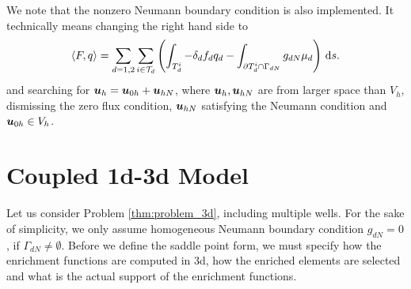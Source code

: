We note that the nonzero Neumann boundary condition is also implemented.
It technically means changing the right hand side to
\begin{equation} \label{eqn:saddle_point_2d_nonzero_neumann}
 \langle F, q\rangle = \sum_{d=1,2}\sum_{i\in \mathcal T_d}\left(
        \int_{T_d^i} - \delta_d f_d q_d
        - \int_{\partial T_d^i\cap \Gamma_{dN}}
                 g_{dN} \mu_d\right) \,{\rm d} s.
\end{equation}
and searching for $\mathbf{\boldsymbol{u}}_h = \mathbf{\boldsymbol{u}}_{0h} + \mathbf{\boldsymbol{u}}_{hN}$,
where $\mathbf{\boldsymbol{u}}_h, \mathbf{\boldsymbol{u}}_{hN}$ are from larger space than $V_h$,
dismissing the zero flux condition, $\mathbf{\boldsymbol{u}}_{hN}$ satisfying the Neumann condition
and $\mathbf{\boldsymbol{u}}_{0h} \in V_h$.




\section{Coupled 1d-3d Model}
\label{sec:coupled_13d}
Let us consider Problem \ref{thm:problem_3d}, including multiple wells.
For the sake of simplicity, we only assume homogeneous Neumann boundary condition $g_{dN}=0$, if $\Gamma_{dN}\neq\emptyset$.
Before we define the saddle point form, we must specify how the enrichment functions are computed in 3d,
how the enriched elements are selected and what is the actual support of the enrichment functions.


